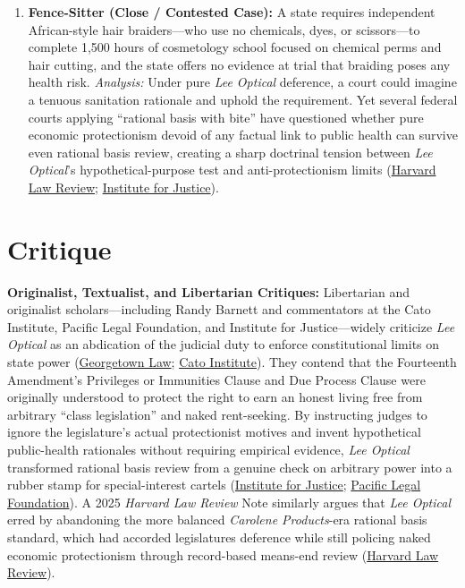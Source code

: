 \documentclass[12pt]{article}
\begin{document}
\begin{enumerate}
    \item \textbf{Fence-Sitter (Close / Contested Case):} A state requires independent African-style hair braiders---who use no chemicals, dyes, or scissors---to complete 1,500 hours of cosmetology school focused on chemical perms and hair cutting, and the state offers no evidence at trial that braiding poses any health risk. \textit{Analysis:} Under pure \textit{Lee Optical} deference, a court could imagine a tenuous sanitation rationale and uphold the requirement. Yet several federal courts applying ``rational basis with bite'' have questioned whether pure economic protectionism devoid of any factual link to public health can survive even rational basis review, creating a sharp doctrinal tension between \textit{Lee Optical}'s hypothetical-purpose test and anti-protectionism limits (\href{https://harvardlawreview.org/print/vol-138/when-rational-basis-review-bit/}{Harvard Law Review}; \href{https://ij.org/cje-post/the-rational-basis-test-the-story-continues/}{Institute for Justice}).
\end{enumerate}

\section{Critique}
\textbf{Originalist, Textualist, and Libertarian Critiques:} Libertarian and originalist scholars---including Randy Barnett and commentators at the Cato Institute, Pacific Legal Foundation, and Institute for Justice---widely criticize \textit{Lee Optical} as an abdication of the judicial duty to enforce constitutional limits on state power (\href{https://scholarship.law.georgetown.edu/cgi/viewcontent.cgi?referer=&httpsredir=1&article=2084&context=facpub}{Georgetown Law}; \href{https://www.cato.org/blog/hard-problem-abortion-rights}{Cato Institute}). They contend that the Fourteenth Amendment's Privileges or Immunities Clause and Due Process Clause were originally understood to protect the right to earn an honest living free from arbitrary ``class legislation'' and naked rent-seeking. By instructing judges to ignore the legislature's actual protectionist motives and invent hypothetical public-health rationales without requiring empirical evidence, \textit{Lee Optical} transformed rational basis review from a genuine check on arbitrary power into a rubber stamp for special-interest cartels (\href{https://ij.org/cje-post/the-rational-basis-test-the-story-continues/}{Institute for Justice}; \href{https://pacificlegal.org/discourse-irrational-basis/}{Pacific Legal Foundation}). A 2025 \textit{Harvard Law Review} Note similarly argues that \textit{Lee Optical} erred by abandoning the more balanced \textit{Carolene Products}-era rational basis standard, which had accorded legislatures deference while still policing naked economic protectionism through record-based means-end review (\href{https://harvardlawreview.org/print/vol-138/when-rational-basis-review-bit/}{Harvard Law Review}).
\end{document}
